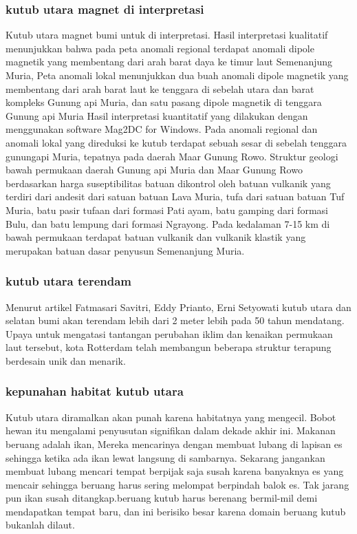 \subsubsection{kutub utara magnet di interpretasi}
		Kutub utara magnet bumi untuk di interpretasi. Hasil interpretasi kualitatif menunjukkan bahwa pada peta anomali regional terdapat anomali dipole 
	magnetik yang membentang dari arah barat daya ke timur laut Semenanjung Muria, Peta anomali lokal menunjukkan dua buah anomali dipole magnetik yang 
	membentang dari arah barat laut ke tenggara di sebelah utara dan barat kompleks Gunung api Muria, dan satu pasang dipole magnetik di tenggara Gunung api
	Muria Hasil interpretasi kuantitatif yang dilakukan dengan menggunakan software Mag2DC for Windows. Pada anomali regional dan anomali lokal yang direduksi
	ke kutub terdapat sebuah sesar di sebelah tenggara gunungapi Muria, tepatnya pada daerah Maar Gunung Rowo. Struktur geologi bawah permukaan daerah 
	Gunung api Muria dan Maar Gunung Rowo berdasarkan harga suseptibilitas batuan dikontrol oleh batuan vulkanik yang terdiri dari andesit dari 
	satuan batuan Lava Muria, tufa dari satuan batuan Tuf Muria, batu pasir tufaan dari formasi Pati ayam, batu gamping dari formasi Bulu, dan 
	batu lempung dari formasi Ngrayong. Pada kedalaman 7-15 km di bawah permukaan terdapat batuan vulkanik dan vulkanik klastik yang merupakan 
	batuan dasar penyusun Semenanjung Muria.
	
\subsubsection {kutub utara terendam}
		Menurut artikel Fatmasari Savitri, Eddy Prianto, Erni Setyowati kutub utara dan selatan bumi akan terendam lebih dari 2 meter lebih pada 50 tahun mendatang. Upaya untuk mengatasi tantangan perubahan iklim dan kenaikan permukaan laut tersebut, kota Rotterdam telah membangun beberapa struktur terapung berdesain unik dan menarik. 
	
\subsubsection {kepunahan habitat kutub utara}
		Kutub utara diramalkan akan punah karena habitatnya yang mengecil. Bobot hewan itu mengalami penyusutan signifikan dalam dekade akhir ini.
	Makanan beruang adalah ikan, Mereka mencarinya dengan membuat lubang di lapisan es sehingga ketika ada ikan lewat langsung di sambarnya. Sekarang jangankan membuat lubang mencari tempat berpijak saja susah karena banyaknya es yang mencair sehingga beruang harus sering melompat berpindah balok es. Tak jarang pun ikan susah ditangkap.beruang kutub harus berenang bermil-mil demi mendapatkan tempat baru, dan ini berisiko besar karena domain beruang kutub bukanlah dilaut.
	
		


